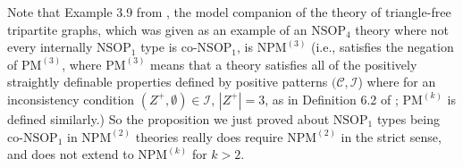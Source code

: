 \documentclass{article}
\theoremstyle{definition}
\theoremstyle{definition}
\theoremstyle{definition}
\begin{document}
Note that Example 3.9 from \cite{mutchnik2023properties}, the model companion of the theory of triangle-free tripartite graphs, which was given as an example of an $\mathrm{NSOP}_{4}$ theory where not every internally $\mathrm{NSOP}_{1}$ type is co-$\mathrm{NSOP}_{1}$, is $\mathrm{NPM}^{(3)}$ (i.e., satisfies the negation of $\mathrm{PM}^{(3)}$, where $\mathrm{PM}^{(3)}$ means that a theory satisfies all of the positively straightly definable properties defined by positive patterns $(\mathcal{C}, \mathcal{I}$) where for an inconsistency condition $(Z^{+}, \emptyset) \in \mathcal{I}$, $|Z^{+}|=3$, as in Definition 6.2 of \cite{bailetti2024walk}; $\mathrm{PM}^{(k)}$ is defined similarly.) So the proposition we just proved about $\mathrm{NSOP}_{1}$ types being co-$\mathrm{NSOP}_{1}$ in $\mathrm{NPM}^{(2)}$ theories really does require $\mathrm{NPM}^{(2)}$ in the strict sense, and does not extend to $\mathrm{NPM}^{(k)}$ for $k > 2$.


\end{document}
